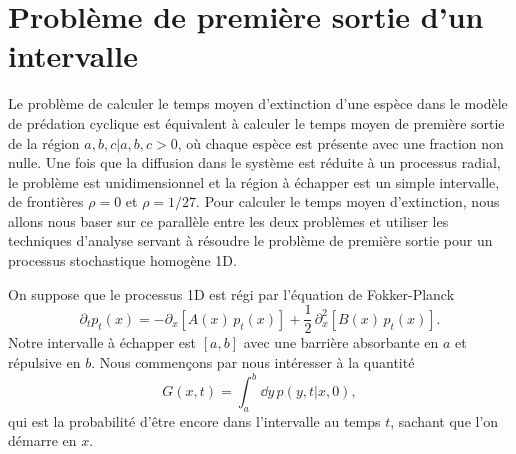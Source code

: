 \documentclass[openany,a4paper,12pt]{article}
\begin{document}
\section{Problème de première sortie d'un intervalle}
\label{section_echap}

\par Le problème de calculer le temps moyen d'extinction d'une espèce dans le modèle de prédation cyclique est équivalent à calculer le temps moyen de première sortie de la région ${a,b,c|a,b,c>0}$, où chaque espèce est présente avec une fraction non nulle. Une fois que la diffusion dans le système est réduite à un processus radial, le problème est unidimensionnel et la région à échapper est un simple intervalle, de frontières $\rho=0$ et $\rho=1/27$. Pour calculer le temps moyen d'extinction, nous allons nous baser sur ce parallèle entre les deux problèmes et utiliser les techniques d'analyse servant à résoudre le problème de première sortie pour un processus stochastique homogène 1D.

\par On suppose que le processus 1D est régi par l'équation de Fokker-Planck
%
\begin{equation}\label{echap_eq_FP}
	\partial_t p_t(x) = - \partial_x[ A(x) \, p_t(x) ] + \frac 12 \, \partial_x^2 [ B(x) \, p_t(x) ] .
\end{equation}
%
Notre intervalle à échapper est $[a,b]$ avec une barrière absorbante en $a$ et répulsive en $b$. Nous commençons par nous intéresser à la quantité 
%
\begin{equation}\label{echap_def_G}
	G(x,t) = \int_a^b \dd y \, p(y,t|x,0),
\end{equation}
%
qui est la probabilité d'être encore dans l'intervalle au temps $t$, sachant que l'on démarre en $x$.
\end{document}

